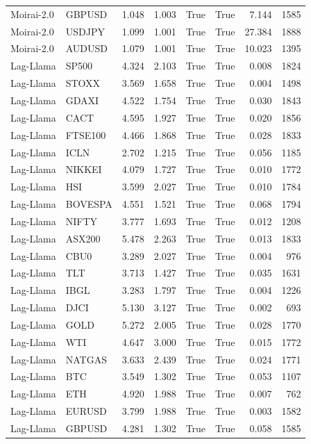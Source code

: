 \begin{table}[H]
\begin{tabular}{llrrrrrr}
Moirai-2.0 & GBPUSD & 1.048 & 1.003 & True & True & 7.144 & 1585 \\
Moirai-2.0 & USDJPY & 1.099 & 1.001 & True & True & 27.384 & 1888 \\
Moirai-2.0 & AUDUSD & 1.079 & 1.001 & True & True & 10.023 & 1395 \\
Lag-Llama & SP500 & 4.324 & 2.103 & True & True & 0.008 & 1824 \\
Lag-Llama & STOXX & 3.569 & 1.658 & True & True & 0.004 & 1498 \\
Lag-Llama & GDAXI & 4.522 & 1.754 & True & True & 0.030 & 1843 \\
Lag-Llama & CACT & 4.595 & 1.927 & True & True & 0.020 & 1856 \\
Lag-Llama & FTSE100 & 4.466 & 1.868 & True & True & 0.028 & 1833 \\
Lag-Llama & ICLN & 2.702 & 1.215 & True & True & 0.056 & 1185 \\
Lag-Llama & NIKKEI & 4.079 & 1.727 & True & True & 0.010 & 1772 \\
Lag-Llama & HSI & 3.599 & 2.027 & True & True & 0.010 & 1784 \\
Lag-Llama & BOVESPA & 4.551 & 1.521 & True & True & 0.068 & 1794 \\
Lag-Llama & NIFTY & 3.777 & 1.693 & True & True & 0.012 & 1208 \\
Lag-Llama & ASX200 & 5.478 & 2.263 & True & True & 0.013 & 1833 \\
Lag-Llama & CBU0 & 3.289 & 2.027 & True & True & 0.004 & 976 \\
Lag-Llama & TLT & 3.713 & 1.427 & True & True & 0.035 & 1631 \\
Lag-Llama & IBGL & 3.283 & 1.797 & True & True & 0.004 & 1226 \\
Lag-Llama & DJCI & 5.130 & 3.127 & True & True & 0.002 & 693 \\
Lag-Llama & GOLD & 5.272 & 2.005 & True & True & 0.028 & 1770 \\
Lag-Llama & WTI & 4.647 & 3.000 & True & True & 0.015 & 1772 \\
Lag-Llama & NATGAS & 3.633 & 2.439 & True & True & 0.024 & 1771 \\
Lag-Llama & BTC & 3.549 & 1.302 & True & True & 0.053 & 1107 \\
Lag-Llama & ETH & 4.920 & 1.988 & True & True & 0.007 & 762 \\
Lag-Llama & EURUSD & 3.799 & 1.988 & True & True & 0.003 & 1582 \\
Lag-Llama & GBPUSD & 4.281 & 1.302 & True & True & 0.058 & 1585 \\

\end{tabular}
\end{table}
